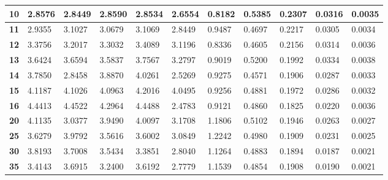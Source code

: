 \begin{table}[ht]
\begin{tabular}{|l|l|l|l|l|l|l|l|l|l|l|}
\textbf{10}      & 2.8576            & 2.8449            & 2.8590            & 2.8534            & 2.6554           & 0.8182           & 0.5385          & 0.2307          & 0.0316          & 0.0035         \\ \hline
\textbf{11}      & 2.9355            & 3.1027            & 3.0679            & 3.1069            & 2.8449           & 0.9487           & 0.4697          & 0.2217          & 0.0305          & 0.0034         \\ \hline
\textbf{12}      & 3.3756            & 3.2017            & 3.3032            & 3.4089            & 3.1196           & 0.8336           & 0.4605          & 0.2156          & 0.0314          & 0.0036         \\ \hline
\textbf{13}      & 3.6424            & 3.6594            & 3.5837            & 3.7567            & 3.2797           & 0.9019           & 0.5200          & 0.1992          & 0.0334          & 0.0038         \\ \hline
\textbf{14}      & 3.7850            & 2.8458            & 3.8870            & 4.0261            & 2.5269           & 0.9275           & 0.4571          & 0.1906          & 0.0287          & 0.0033         \\ \hline
\textbf{15}      & 4.1187            & 4.1026            & 4.0963            & 4.2016            & 4.0495           & 0.9256           & 0.4881          & 0.1972          & 0.0286          & 0.0032         \\ \hline
\textbf{16}      & 4.4413            & 4.4522            & 4.2964            & 4.4488            & 2.4783           & 0.9121           & 0.4860          & 0.1825          & 0.0220          & 0.0036         \\ \hline
\textbf{20}      & 4.1135            & 3.0377            & 3.9490            & 4.0097            & 3.1708           & 1.1806           & 0.5102          & 0.1946          & 0.0263          & 0.0027         \\ \hline
\textbf{25}      & 3.6279            & 3.9792            & 3.5616            & 3.6002            & 3.0849           & 1.2242           & 0.4980          & 0.1909          & 0.0231          & 0.0025         \\ \hline
\textbf{30}      & 3.8193            & 3.7008            & 3.5434            & 3.3851            & 2.8040           & 1.1264           & 0.4883          & 0.1894          & 0.0187          & 0.0021         \\ \hline
\textbf{35}      & 3.4143            & 3.6915            & 3.2400            & 3.6192            & 2.7779           & 1.1539           & 0.4854          & 0.1908          & 0.0190          & 0.0021         \\ \hline

\end{tabular}
\end{table}
